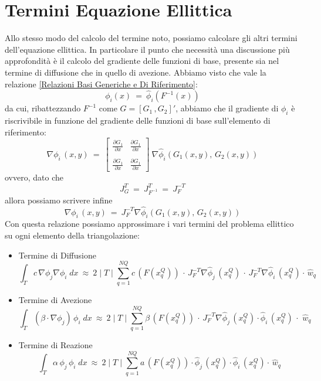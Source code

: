 \documentclass[12pt,a4paper]{report}
\theoremstyle{theorem}
\theoremstyle{theorem}
\theoremstyle{definition}
\begin{document}
\section{Termini Equazione Ellittica}
Allo stesso modo del calcolo del termine noto, possiamo calcolare gli altri termini dell'equazione ellittica. In particolare il punto che necessità una discussione più approfondità è il calcolo del gradiente delle funzioni di base, presente sia nel termine di diffusione che in quello di avezione. Abbiamo visto che vale la relazione \ref{Relazioni Basi Generiche e Di Riferimento}:
\[ \phi_{i}(x) \ = \ \hat{\phi}_{i}(F^{-1}(x)) \]
da cui, ribattezzando $F^{-1}$ come $G = [G_{1} \, , G_{2}]'$, abbiamo che il gradiente di $\phi_{i}$ è riscrivibile in funzione del gradiente delle funzioni di base sull'elemento di riferimento:
\[
\nabla \phi_{i} \, (x,y) \ = \ \left[ \begin{array}{ccc}
\frac{\partial G_{1}}{\partial x} & \frac{\partial G_{1}}{\partial x} \\
& \\
\frac{\partial G_{1}}{\partial x} & \frac{\partial G_{1}}{\partial x} \end{array} \right] \ \nabla \hat{\phi}_{i} \left( G_{1}(x,y), \, G_{2}(x,y)  \right)
\]
ovvero, dato che 
\[ J_{G}^{T} \ = \ J_{F^{-1}}^{T} \ = \ J_{F}^{-T} \]
allora possiamo scrivere infine
\[
\nabla \phi_{i} \, (x,y) \ = \ J_{F}^{-T} \nabla \hat{\phi}_{i} \left( G_{1}(x,y), \, G_{2}(x,y)  \right)
\]
Con questa relazione possiamo approssimare i vari termini del problema ellittico su ogni elemento della triangolazione:
\begin{itemize}
\item Termine di Diffusione
\[ \int_{T}{c \, \nabla \phi_{j} \nabla \phi_{i} \; dx} \ \approx \ 2 \mid T \mid \sum_{q = 1}^{NQ} { c \, (F(x_{q}^{Q} )) \, \cdot \, J_{F}^{-T} \nabla  \hat{\phi}_{j} \, ( x_{q}^{Q} ) \, \cdot \, J_{F}^{-T} \nabla \hat{\phi}_{i} \, ( x_{q}^{Q} ) \cdot \, \hat{w}_{q} } \]
\item Termine di Avezione
\[ \int_{T}{(\beta \cdot \nabla \phi_{j}) \, \phi_{i} \; dx} \ \approx \ 2 \mid T \mid \sum_{q = 1}^{NQ} { \beta \, (F(x_{q}^{Q} )) \, \cdot \, J_{F}^{-T} \nabla \hat{\phi}_{j} \, ( x_{q}^{Q} ) \cdot \hat{\phi}_{i} \, ( x_{q}^{Q} ) \, \cdot \, \, \hat{w}_{q} } \]
\item Termine di Reazione
\[ \int_{T}{\alpha \, \phi_{j} \, \phi_{i} \; dx} \ \approx \ 2 \mid T \mid \sum_{q = 1}^{NQ} { a \, (F(x_{q}^{Q} )) \cdot \hat{\phi}_{j} \, ( x_{q}^{Q} ) \cdot \hat{\phi}_{i} \, ( x_{q}^{Q} ) \cdot \, \hat{w}_{q} } \]
\end{itemize}
\end{document}
